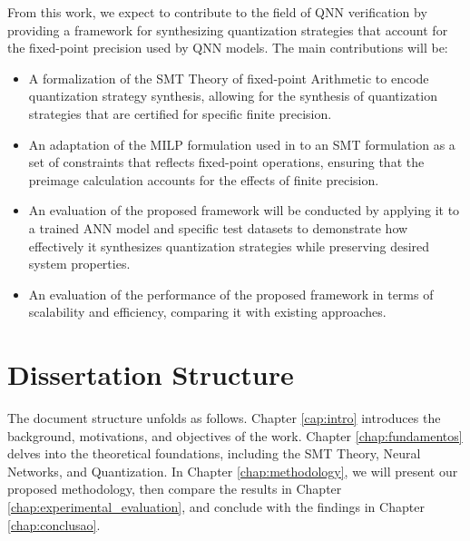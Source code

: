 From this work, we expect to contribute to the field of QNN verification by providing a framework for synthesizing quantization strategies that account for the fixed-point precision used by QNN models. The main contributions will be:
\begin{itemize}
    \item A formalization of the SMT Theory of fixed-point Arithmetic to encode quantization strategy synthesis, allowing for the synthesis of quantization strategies that are certified for specific finite precision.
    \item An adaptation of the MILP formulation used in \cite{cai2025certified} to an SMT formulation as a set of constraints that reflects fixed-point operations, ensuring that the preimage calculation accounts for the effects of finite precision.
       \item  An evaluation of the proposed framework will be conducted by applying it to a trained ANN model and specific test datasets to demonstrate how effectively it synthesizes quantization strategies while preserving desired system properties.
    \item An evaluation of the performance of the proposed framework in terms of scalability and efficiency, comparing it with existing approaches.
\end{itemize}   

\section{Dissertation Structure}\label{sec:dissertation_structure}

The document structure unfolds as follows. Chapter \ref{cap:intro} introduces the background, motivations, and objectives of the work. Chapter \ref{chap:fundamentos} delves into the theoretical foundations, including the SMT Theory, Neural Networks, and Quantization. In Chapter \ref{chap:methodology}, we will present our proposed methodology, then compare the results in Chapter \ref{chap:experimental_evaluation}, and conclude with the findings in Chapter \ref{chap:conclusao}.


